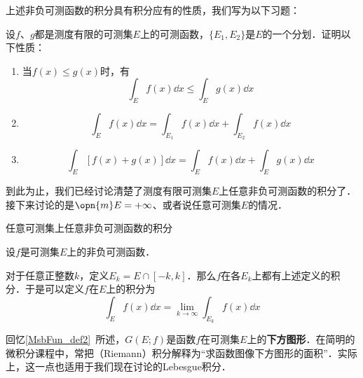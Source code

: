 上述非负可测函数的积分具有积分应有的性质，我们写为以下习题：

\begin{exercise}{}
设$f$、$g$都是测度有限的可测集$E$上的可测函数，$\{E_1, E_2\}$是$E$的一个分划．证明以下性质：
\begin{enumerate}
\item 当$f(x)\leq g(x)$时，有
\begin{equation}
\int_E f(x) \dd x\leq \int_E g(x) \dd x
\end{equation}
\item 
\begin{equation}
\int_E f(x) \dd x=\int_{E_1} f(x) \dd x+\int_{E_2} f(x) \dd x
\end{equation}
\item 
\begin{equation}
\int_E [f(x)+g(x)] \dd x = \int_E f(x) \dd x+\int_E g(x) \dd x
\end{equation}
\end{enumerate}

\end{exercise}


到此为止，我们已经讨论清楚了测度有限可测集$E$上任意非负可测函数的积分了．接下来讨论的是$\opn{m}E=+\infty$、或者说任意可测集$E$的情况．

\begin{definition}{任意可测集上任意非负可测函数的积分}

设$f$是可测集$E$上的非负可测函数．

对于任意正整数$k$，定义$E_k=E\cap [-k, k]$．那么$f$在各$E_k$上都有上述定义的积分．于是可以定义$f$在$E$上的积分为
\begin{equation}
\int_E f(x) \dd x = \lim\limits_{k\to\infty}\int_{E_k} f(x) \dd x
\end{equation}

\end{definition}


回忆\autoref{MsbFun_def2}~所述，$G(E; f)$是函数$f$在可测集$E$上的\textbf{下方图形}．在简明的微积分课程中，常把（Riemann）积分解释为“求函数图像下方图形的面积”．实际上，这一点也适用于我们现在讨论的Lebesgue积分．

